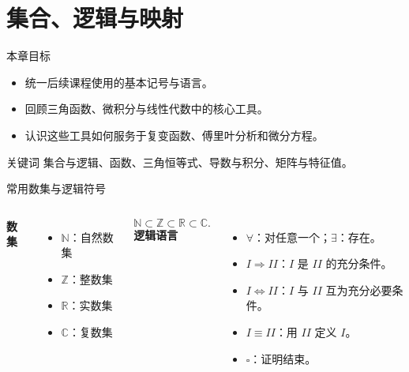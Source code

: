 \section{集合、逻辑与映射}

\begin{frame}{本章目标}
  \begin{itemize}
    \item 统一后续课程使用的基本记号与语言。
    \item 回顾三角函数、微积分与线性代数中的核心工具。
    \item 认识这些工具如何服务于复变函数、傅里叶分析和微分方程。
  \end{itemize}
  \begin{block}{关键词}
    集合与逻辑、函数、三角恒等式、导数与积分、矩阵与特征值。
  \end{block}
\end{frame}

\begin{frame}{常用数集与逻辑符号}
  \small
  \begin{columns}[T]
    \textbf{数集}
    \begin{itemize}
      \item $\mathbb{N}$：自然数集
      \item $\mathbb{Z}$：整数集
      \item $\mathbb{R}$：实数集
      \item $\mathbb{C}$：复数集
    \end{itemize}
    \[
      \mathbb{N}\subset\mathbb{Z}\subset\mathbb{R}\subset\mathbb{C}.
    \]
    \textbf{逻辑语言}
    \begin{itemize}
      \item $\forall$：对任意一个；$\exists$：存在。
      \item $I\Rightarrow II$：$I$ 是 $II$ 的充分条件。
      \item $I\Leftrightarrow II$：$I$ 与 $II$ 互为充分必要条件。
      \item $I\equiv II$：用 $II$ 定义 $I$。
      \item $\square$：证明结束。
    \end{itemize}
  \end{columns}
\end{frame}

